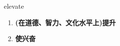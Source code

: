 
\begin{frame}
{\huge elevate}
\begin{center}
\begin{enumerate}\Large
  \item \textbf{(在道德、智力、文化水平上)提升}
  \item \textbf{使兴奋}
\end{enumerate}
\end{center}
\end{frame}
